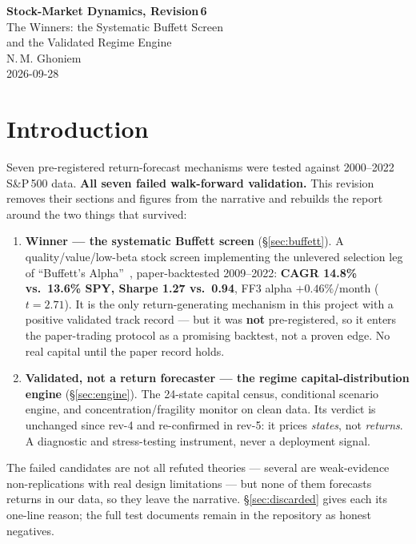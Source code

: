 \documentclass[11pt,a4paper]{article}
\begin{document}
\begin{center}
{\Large\bfseries\color{nmblue} Stock-Market Dynamics, Revision\,6}\\[0.4em]
{\large The Winners: the Systematic Buffett Screen\\ and the Validated Regime Engine}\\[1.0em]
{\normalsize N.\,M. Ghoniem}\\[0.3em]
{\small 2026-09-28}
\end{center}

\tableofcontents
\newpage

\section{Introduction}

Seven pre-registered return-forecast mechanisms were tested against 2000--2022 S\&P\,500 data. \textbf{All seven failed walk-forward validation.} This revision removes their sections and figures from the narrative and rebuilds the report around the two things that survived:

\begin{enumerate}
\item \textbf{Winner --- the systematic Buffett screen} (\S\ref{sec:buffett}). A quality/value/low-beta stock screen implementing the unlevered selection leg of ``Buffett's Alpha''~\cite{FKP2018}, paper-backtested 2009--2022: \textbf{CAGR 14.8\% vs.\ 13.6\% SPY, Sharpe 1.27 vs.\ 0.94}, FF3 alpha $+0.46\%$/month ($t=2.71$). It is the only return-generating mechanism in this project with a positive validated track record --- but it was \textbf{not} pre-registered, so it enters the paper-trading protocol as a promising backtest, not a proven edge. No real capital until the paper record holds.
\item \textbf{Validated, not a return forecaster --- the regime capital-distribution engine} (\S\ref{sec:engine}). The 24-state capital census, conditional scenario engine, and concentration/fragility monitor on clean data. Its verdict is unchanged since rev-4 and re-confirmed in rev-5: it prices \emph{states}, not \emph{returns}. A diagnostic and stress-testing instrument, never a deployment signal.
\end{enumerate}

The failed candidates are not all refuted theories --- several are weak-evidence non-replications with real design limitations --- but none of them forecasts returns in our data, so they leave the narrative. \S\ref{sec:discarded} gives each its one-line reason; the full test documents remain in the repository as honest negatives.
\end{document}
